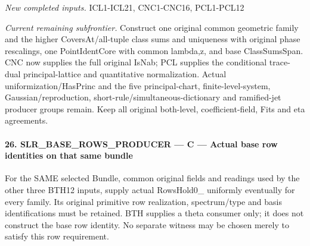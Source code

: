 \emph{New completed inputs.} ICL1-ICL21, CNC1-CNC16, PCL1-PCL12

\emph{Current remaining subfrontier.} Construct one original common geometric family and the higher CoversAt/all-tuple class sums and uniqueness with original phase rescalings, one PointIdentCore with common lambda,z, and base ClassSumsSpan. CNC now supplies the full original IsNab; PCL supplies the conditional trace-dual principal-lattice and quantitative normalization. Actual uniformization/HasPrinc and the five principal-chart, finite-level-system, Gaussian/reproduction, short-rule/simultaneous-dictionary and ramified-jet producer groups remain. Keep all original both-level, coefficient-field, Fits and eta agreements.



\paragraph{26. SLR\_\allowbreak BASE\_\allowbreak ROWS\_\allowbreak PRODUCER — C — Actual base row identities on that same bundle}

For the SAME selected Bundle, common original fields and readings used by the other three BTH12 inputs, supply actual RowsHold0\_ uniformly eventually for every family. Its original primitive row realization, spectrum/type and basis identifications must be retained. BTH supplies a theta consumer only; it does not construct the base row identity. No separate witness may be chosen merely to satisfy this row requirement.


